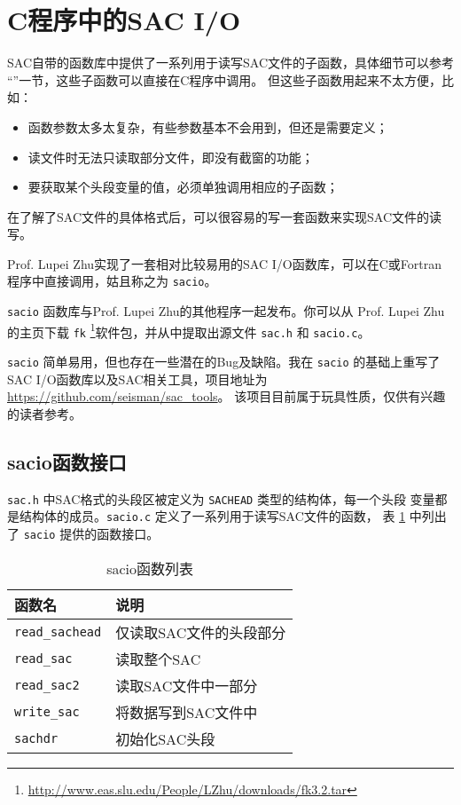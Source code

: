 \section{C程序中的SAC I/O}
SAC自带的函数库中提供了一系列用于读写SAC文件的子函数，具体细节可以参考
``''一节，这些子函数可以直接在C程序中调用。
但这些子函数用起来不太方便，比如：
\begin{itemize}
\item 函数参数太多太复杂，有些参数基本不会用到，但还是需要定义；
\item 读文件时无法只读取部分文件，即没有截窗的功能；
\item 要获取某个头段变量的值，必须单独调用相应的子函数；
\end{itemize}

在了解了SAC文件的具体格式后，可以很容易的写一套函数来实现SAC文件的读写。

Prof. Lupei Zhu实现了一套相对比较易用的SAC I/O函数库，可以在C或Fortran
程序中直接调用，姑且称之为 \texttt{sacio}。

\texttt{sacio} 函数库与Prof. Lupei Zhu的其他程序一起发布。你可以从
Prof. Lupei Zhu的主页下载 \texttt{fk} \footnote{\url{http://www.eas.slu.edu/People/LZhu/downloads/fk3.2.tar}}软件包，并从中提取出源文件 \texttt{sac.h} 和 \texttt{sacio.c}。

\texttt{sacio} 简单易用，但也存在一些潜在的Bug及缺陷。我在 \texttt{sacio} 的基础上重写了
SAC I/O函数库以及SAC相关工具，项目地址为 \url{https://github.com/seisman/sac_tools}。
该项目目前属于玩具性质，仅供有兴趣的读者参考。

\subsection{sacio函数接口}
\texttt{sac.h} 中SAC格式的头段区被定义为 \texttt{SACHEAD} 类型的结构体，每一个头段
变量都是结构体的成员。\texttt{sacio.c} 定义了一系列用于读写SAC文件的函数，
表 \ref{table:sacio-function} 中列出了 \texttt{sacio} 提供的函数接口。

\begin{table}[H]
\centering
\caption{sacio函数列表}
\label{table:sacio-function}
\begin{tabular}{ll}
\toprule
函数名      &   说明        \\
\midrule
\verb|read_sachead|      &   仅读取SAC文件的头段部分 \\
\verb|read_sac|          &   读取整个SAC \\
\verb|read_sac2|         &   读取SAC文件中一部分 \\
\verb|write_sac|         &   将数据写到SAC文件中 \\
\verb|sachdr|            &   初始化SAC头段\\
\bottomrule
\end{tabular}
\end{table}

